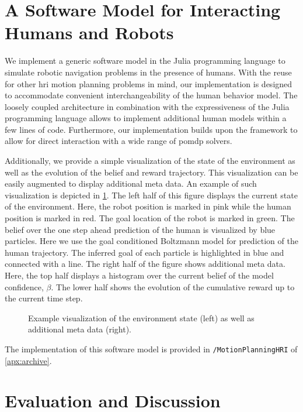 \section{A Software Model for Interacting Humans and Robots}\label{sec:hri-software-model}

We implement a generic software model in the Julia programming language to
simulate robotic navigation problems in the presence of humans. With the reuse
for other \ac{hri} motion planning problems in mind, our implementation is
designed to accommodate convenient interchangeability of the human behavior
model. The loosely coupled architecture in combination with the expressiveness
of the Julia programming language allows to implement additional human models
within a few lines of code. Furthermore, our implementation builds upon the
\pomdpsjl framework to allow for direct interaction with a wide range of
\ac{pomdp} solvers.

Additionally, we provide a simple visualization of the state of the environment
as well as the evolution of the belief and reward trajectory. This
visualization can be easily augmented to display additional meta data. An
example of such visualization is depicted in \cref{fig:hri-software-model}. The
left half of this figure displays the current state of the environment. Here,
the robot position is marked in pink while the human position is marked in red.
The goal location of the robot is marked in green. The belief over the one step
ahead prediction of the human is visualized by blue particles. Here we
use the goal conditioned Boltzmann model for prediction of the human
trajectory. The inferred goal of each particle is highlighted in blue and
connected with a line. The right half of the figure shows additional meta data.
Here, the top half displays a histogram over the current belief of the model
confidence, $\beta$. The lower half shows the evolution of the cumulative
reward up to the current time step.

\begin{figure}[htpb]
  \centering
  \caption{Example visualization of the environment state (left) as well as
           additional meta data (right).}
  \label{fig:hri-software-model}
\end{figure}

The implementation of this software model is provided in
\texttt{\appdata/MotionPlanningHRI} of \cref{apx:archive}.

\section{Evaluation and Discussion}\label{sec:hri-evaluation}

